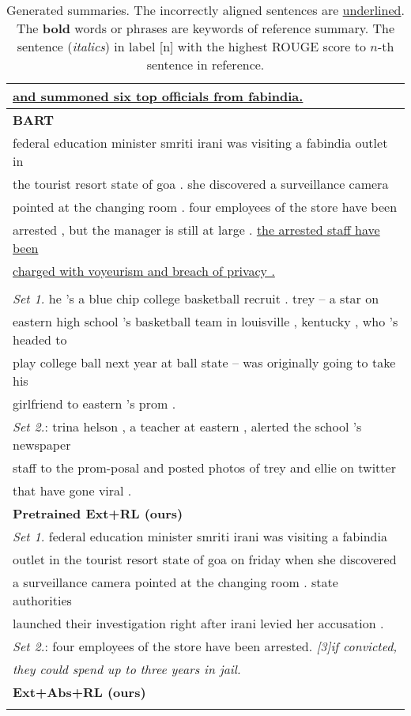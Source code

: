 \begin{table}[th]
\begin{center}
\begin{tabular}{|l|}
	   \underline{and summoned six top officials from fabindia.} \\
\hline \bf BART \cite{BART19} \\
\hline federal education minister smriti irani was visiting a fabindia outlet in \\
       the tourist resort state of goa . she discovered a surveillance camera \\
	   pointed at the changing room . four employees of the store have been \\
	   arrested , but the manager is still at large . \underline{the arrested staff have been} \\
	   \underline{charged with voyeurism and breach of privacy .} \\
\cut{%
\hline \bf Pretrained Ext (ours) \\
\hline \textit{Set 1.} he 's a blue chip college basketball recruit . trey -- a star on \\
       eastern high school 's basketball team in louisville , kentucky , who 's headed to \\
	   play college ball next year at ball state -- was originally going to take his \\
	   girlfriend to eastern 's prom .\\
	   \textit{Set 2.}: trina helson , a teacher at eastern , alerted the school 's newspaper \\
	   staff to the prom-posal and posted photos of trey and ellie on twitter\\
	   that have gone viral . \\
\hline \bf Pretrained Ext+RL (ours) \\
\hline \textit{Set 1.} federal education minister smriti irani was visiting a fabindia \\
       outlet in the tourist resort state of goa on friday when she discovered \\
	   a surveillance camera pointed at the changing room . state authorities \\
	   launched their investigation right after irani levied her accusation .\\
	   \textit{Set 2.}: four employees of the store have been arrested. \textit{[3]if convicted,} \\
	   \textit{they could spend up to three years in jail.} \\
\hline \bf Ext+Abs+RL (ours) \\
}%
\hline
\end{tabular}
\end{center}
\caption{\label{tab:example} Generated summaries. The incorrectly aligned sentences are \underline{underlined}. 
The \textbf{bold} words or phrases are keywords of reference summary. 
The sentence (\textit{italics}) in label [n] with the highest ROUGE score to $n$-th
sentence in reference.}
\end{table}

